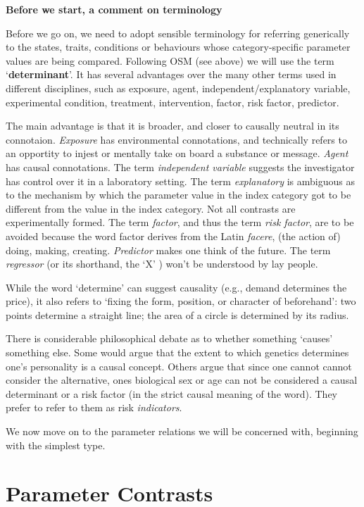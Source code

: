 \documentclass[]{book}
\begin{document}
\textbf{Before we start, a comment on terminology}

Before we go on, we need to adopt sensible terminology for referring generically to the states, traits, conditions or behaviours whose category-specific parameter values are being compared. Following OSM (see above) we will use the term `\textbf{determinant}'. It has several advantages over the many other terms used in different disciplines, such as exposure, agent, independent/explanatory variable, experimental condition, treatment, intervention, factor, risk factor, predictor.

The main advantage is that it is broader, and closer to causally neutral in its connotaion. \emph{Exposure} has environmental connotations, and technically refers to an opportity to injest or mentally take on board a substance or message. \emph{Agent} has causal connotations. The term \emph{independent variable} suggests the investigator has control over it in a laboratory setting. The term \emph{explanatory} is ambiguous as to the mechanism by which the parameter value in the index category got to be different from the value in the index category. Not all contrasts are experimentally formed. The term \emph{factor}, and thus the term \emph{risk factor}, are to be avoided because the word factor derives from the Latin \emph{facere}, (the action of) doing, making, creating. \emph{Predictor} makes one think of the future. The term \emph{regressor} (or its shorthand, the `X' ) won't be understood by lay people.

While the word `determine' can suggest causality (e.g., demand determines the price), it also refers to `fixing the form, position, or character of beforehand': two points determine a straight line; the area of a circle is determined by its radius.

There is considerable philosophical debate as to whether something `causes' something else. Some would argue that the extent to which genetics determines one's personality is a causal concept. Others argue that since one cannot cannot consider the alternative, ones biological sex or age can not be considered a causal determinant or a risk factor (in the strict causal meaning of the word). They prefer to refer to them as risk \emph{indicators}.

We now move on to the parameter relations we will be concerned with, beginning with the simplest type.

\hypertarget{parameter-contrasts-1}{%
\section{Parameter Contrasts}\label{parameter-contrasts-1}}
\end{document}
